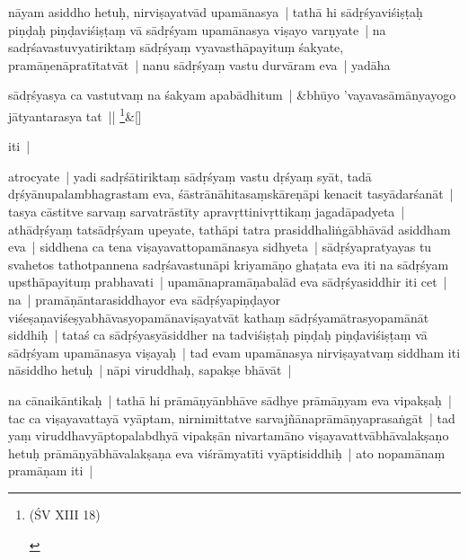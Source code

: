 \documentclass[article,a4paper]{memoir}
\begin{document}
	  \pstart nā\-yam asiddho hetuḥ, nirviṣayatvā\-d upamā\-nasya | tathā\- hi sā\-dṛśyaviśiṣṭaḥ piṇḍaḥ piṇḍaviśiṣṭaṃ vā\- sā\-dṛśyam upamā\-nasya viṣayo varṇyate | na sadṛśavastuvyatiriktaṃ sā\-dṛśyaṃ vyavasthā\-payituṃ śakyate, pramā\-ṇenā\-pratī\-tatvā\-t | \label{thakur75-102.14} nanu sā\-dṛśyaṃ vastu durvā\-ram eva | yadā\-ha
	\pend
      
	    
	    \stanza[\smallbreak]
sā\-dṛśyasya ca vastutvaṃ na śakyam apabā\-dhitum | &bhū\-yo 'vayavasā\-mā\-nyayogo jā\-tyantarasya tat || \footnote{\begin{english}(ŚV XIII 18)\end{english}}\&[\smallbreak]


	

	  \pstart iti |
	\pend
      

	  \pstart atrocyate | yadi sadṛśā\-tiriktaṃ sā\-dṛśyaṃ vastu dṛśyaṃ syā\-t, tadā\- dṛśyā\-nupalambhagrastam eva, śā\-strā\-nā\-hitasaṃskā\-reṇā\-pi kenacit tasyā\-darśanā\-t | tasya cā\-stitve sarvaṃ sarvatrā\-stī\-ty apravṛttinivṛttikaṃ jagadā\-padyeta | athā\-dṛśyaṃ tatsā\-dṛśyam upeyate, tathā\-pi tatra prasiddhaliṅgā\-bhā\-vā\-d asiddham eva | siddhena ca tena viṣayavattopamā\-nasya sidhyeta | sā\-dṛśyapratyayas tu svahetos tathotpannena sadṛśavastunā\-pi kriyamā\-ṇo ghaṭata eva iti na sā\-dṛśyam upsthā\-payituṃ prabhavati | upamā\-napramā\-ṇabalā\-d eva sā\-dṛśyasiddhir iti cet | na | pramā\-ṇā\-ntarasiddhayor eva sā\-dṛśyapiṇḍayor viśeṣaṇaviśeṣyabhā\-vasyopamā\-naviṣayatvā\-t kathaṃ sā\-dṛśyamā\-trasyopamā\-nā\-t siddhiḥ | tataś ca sā\-dṛśyasyā\-siddher na tadviśiṣṭaḥ piṇḍaḥ piṇḍaviśiṣṭaṃ vā\- sā\-dṛśyam upamā\-nasya viṣayaḥ | tad evam upamā\-nasya nirviṣayatvaṃ siddham iti nā\-siddho hetuḥ | nā\-pi viruddhaḥ, sapakṣe bhā\-vā\-t |
	\pend
      

	  \pstart na cā\-naikā\-ntikaḥ | tathā\- hi prā\-mā\-ṇyā\-nbhā\-ve sā\-dhye prā\-mā\-ṇyam eva vipakṣaḥ | tac ca viṣayavattayā\- vyā\-ptam, nirnimittatve sarvajñā\-naprā\-mā\-ṇyaprasaṅgā\-t | tad yaṃ viruddhavyā\-ptopalabdhyā\- vipakṣā\-n nivartamā\-no viṣayavattvā\-bhā\-valakṣaṇo hetuḥ prā\-mā\-ṇyā\-bhā\-valakṣaṇa eva viśrā\-myatī\-ti vyā\-ptisiddhiḥ | ato nopamā\-naṃ pramā\-ṇam iti |
	\pend
      
\end{document}
